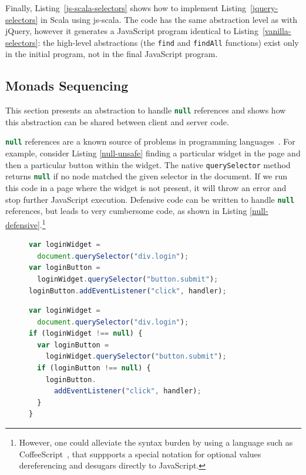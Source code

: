 \documentclass{llncs}
\newcommand{\code}[1]{\lstinline[language=Scala,columns=fixed,basicstyle=\footnotesize]|#1|}
\begin{document}
Finally, Listing~\ref{js-scala-selectors} shows how to implement Listing~\ref{jquery-selectors} in
Scala using js-scala. The code has the same abstraction level as with jQuery, however it
generates a JavaScript program identical to Listing~\ref{vanilla-selectors}: the high-level
abstractions (the \code{find} and \code{findAll} functions) exist only in the initial program, not
in the final JavaScript program.

\subsection{Monads Sequencing}
\label{sec:option}

This section presents an abstraction to handle \code{null} references and shows how this
abstraction can be shared between client and server code.

\code{null} references are a known source of problems in programming
languages~\cite{Hoare09_Null,Nanda09_Null}. For example, consider Listing \ref{null-unsafe} finding
a particular widget in the page and then a particular button within the widget. The native
\code{querySelector} method returns \code{null} if no node matched the given selector in the
document. If we run this code in a page where the widget is not present, it will throw an error
and stop further JavaScript execution. Defensive code can be written to handle \code{null}
references, but leads to very cumbersome code, as shown in Listing \ref{null-defensive}.\footnote{However, one could alleviate the syntax burden by using a language such as CoffeeScript~\cite{Ashkenas2011_CoffeeScript}, that suppports a special notation for optional values dereferencing and desugars directly to JavaScript.}

\begin{figure}[htb]
\begin{lstlisting}[language=JavaScript,label=null-unsafe,caption=Unsafe code]
var loginWidget =
  document.querySelector("div.login");
var loginButton =
  loginWidget.querySelector("button.submit");
loginButton.addEventListener("click", handler);
\end{lstlisting}
\end{figure}


\begin{figure}[htb]
\begin{lstlisting}[language=JavaScript,label=null-defensive,caption=Defensive programming to handle
null references]
var loginWidget =
  document.querySelector("div.login");
if (loginWidget !== null) {
  var loginButton =
    loginWidget.querySelector("button.submit");
  if (loginButton !== null) {
    loginButton.
      addEventListener("click", handler);
  }
}
\end{lstlisting}
\end{figure}
\end{document}
